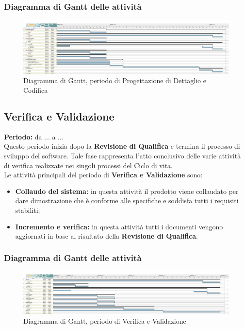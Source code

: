 	\subsubsection{Diagramma di Gantt delle attività}
	\begin{figure}[H]
		\centering
		\includegraphics[width=1\linewidth]{immagini/gantt/progettazione_dettaglio_codifica.png}
		\caption{Diagramma di Gantt, periodo di Progettazione di Dettaglio e Codifica}
	\end{figure}
	\subsection{Verifica e Validazione}
	\textbf{Periodo:} da ... a ... \\
	Questo periodo inizia dopo la \textbf{Revisione di Qualifica} e termina il processo di sviluppo del software. Tale fase rappresenta l'atto conclusivo delle varie attività di verifica realizzate nei singoli processi del Ciclo di vita. \\
	Le attività principali del periodo di \textbf{Verifica e Validazione} sono: \\
	\begin{itemize}
		\item \textbf{Collaudo del sistema:} in questa attività il prodotto viene collaudato per dare
dimostrazione che è conforme alle specifiche e soddisfa tutti i requisiti stabiliti;
		\item \textbf{Incremento e verifica:} in questa attività tutti i documenti vengono aggiornati in base al risultato della \textbf{Revisione di Qualifica}. \\
	\end{itemize}
	\subsubsection{Diagramma di Gantt delle attività}
	\begin{figure}[H]
		\centering
		\includegraphics[width=1\linewidth]{immagini/gantt/validazione.png}
		\caption{Diagramma di Gantt, periodo di Verifica e Validazione}
	\end{figure}